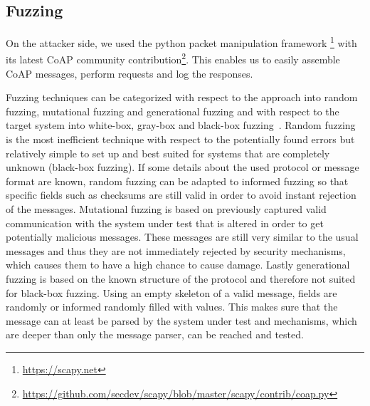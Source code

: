 \subsection{Fuzzing}

On the attacker side, we used the python packet manipulation framework \scapy\footnote{\url{https://scapy.net}} with its latest CoAP community contribution\footnote{\url{https://github.com/secdev/scapy/blob/master/scapy/contrib/coap.py}}. This enables us to easily assemble CoAP messages, perform requests and log the responses.

Fuzzing techniques can be categorized with respect to the approach into random fuzzing, mutational fuzzing and generational fuzzing and with respect to the target system into white-box, gray-box and black-box fuzzing~\cite{neystadtPenTesting}.
Random fuzzing is the most inefficient technique with respect to the potentially found errors but relatively simple to set up and best suited for systems that are completely unknown (black-box fuzzing). If some details about the used protocol or message format are known, random fuzzing can be adapted to informed fuzzing so that specific fields such as checksums are still valid in order to avoid instant rejection of the messages.
Mutational fuzzing is based on previously captured valid communication with the system under test that is altered in order to get potentially malicious messages. These messages are still very similar to the usual messages and thus they are not immediately rejected by security mechanisms, which causes them to have a high chance to cause damage.
Lastly generational fuzzing is based on the known structure of the protocol and therefore not suited for black-box fuzzing. Using an empty skeleton of a valid message, fields are randomly or informed randomly filled with values. This makes sure that the message can at least be parsed by the system under test and mechanisms, which are deeper than only the message parser, can be reached and tested.
